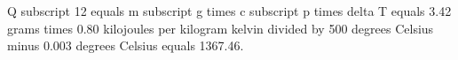 Q subscript 12 equals m subscript g times c subscript p times delta T equals 3.42 grams times 0.80 kilojoules per kilogram kelvin divided by 500 degrees Celsius minus 0.003 degrees Celsius equals 1367.46.